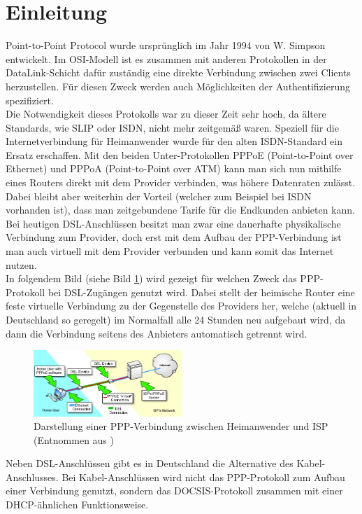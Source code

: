 \documentclass[journal]{IEEEtran}
\begin{document}
\section{Einleitung} 
 Point-to-Point Protocol wurde urspr\"unglich im Jahr 1994 von W. Simpson entwickelt. Im OSI-Modell ist es zusammen mit anderen Protokollen in der DataLink-Schicht daf\"ur zust\"andig eine direkte Verbindung zwischen zwei Clients herzustellen. Für diesen Zweck werden auch M\"oglichkeiten der Authentifizierung spezifiziert. \cite{RFC1661} \\
Die Notwendigkeit dieses Protokolls war zu dieser Zeit sehr hoch, da \"altere Standards, wie SLIP oder ISDN, nicht mehr zeitgem\"a\ss{} waren. Speziell für die Internetverbindung für Heimanwender wurde f\"ur den alten ISDN-Standard ein Ersatz erschaffen. Mit den beiden Unter-Protokollen PPPoE (Point-to-Point over Ethernet)\cite{RFC2516} und PPPoA (Point-to-Point over ATM)\cite{RFC2364} kann man sich nun mithilfe eines Routers direkt mit dem Provider verbinden, was h\"ohere Datenraten zul\"asst. Dabei bleibt aber weiterhin der Vorteil (welcher zum Beispiel bei ISDN vorhanden ist), dass man zeitgebundene Tarife für die Endkunden anbieten kann. Bei heutigen DSL-Anschl\"ussen besitzt man zwar eine dauerhafte physikalische Verbindung zum Provider, doch erst mit dem Aufbau der PPP-Verbindung ist man auch virtuell mit dem Provider verbunden und kann somit das Internet nutzen. \\
In folgendem Bild (siehe Bild \ref{fig:PPP-Visualisierung}) wird gezeigt f\"ur welchen Zweck das PPP-Protokoll bei DSL-Zug\"angen genutzt wird. Dabei stellt der heimische Router eine feste virtuelle Verbindung zu der Gegenstelle des Providers her, welche (aktuell in Deutschland so geregelt) im Normalfall alle 24 Stunden neu aufgebaut wird, da dann die Verbindung seitens des Anbieters automatisch getrennt wird. \\
\begin{figure}[h!]
 \centering
  \includegraphics[width=0.5\textwidth]{img/PPP-Visualisierung}
 \caption{Darstellung einer PPP-Verbindung zwischen Heimanwender und ISP (Entnommen aus \cite{PPP-Bild})}
 \label{fig:PPP-Visualisierung}
\end{figure}
Neben DSL-Anschl\"ussen gibt es in Deutschland die Alternative des Kabel-Anschlusses. Bei Kabel-Anschl\"ussen wird nicht das PPP-Protokoll zum Aufbau einer Verbindung genutzt, sondern das DOCSIS-Protokoll zusammen mit einer DHCP-\"ahnlichen \cite{RFC3256} Funktionsweise. 
\end{document}
